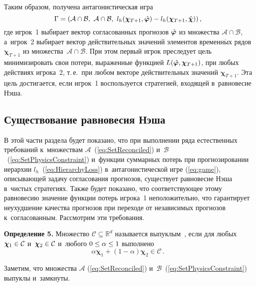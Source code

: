\begin{multicols}{2}
Таким образом, получена антагонистическая игра
\begin{equation}
\label{eq:game}
    \Gamma = (\mathcal{A} \cap \mathcal{B},~\mathcal{A} \cap \mathcal{B},~l_h(\boldsymbol{\chi}_{T+1}, \hat{\boldsymbol{\varphi}}) - l_h(\boldsymbol{\chi}_{T+1}, \hat{\boldsymbol{\chi}}))\,,
\end{equation}
где игрок~1 выбирает вектор согласованных прогнозов $\hat{\boldsymbol{\varphi}}$ из
множества $\mathcal{A} \cap \mathcal{B}$, а~игрок~2 выбирает вектор действительных
значений элементов временн$\acute{\mbox{ы}}$х рядов $\boldsymbol{\chi}_{T+1}$ из
множества~$\mathcal{A} \cap \mathcal{B}$. При этом первый игрок преследует цель
минимизировать свои потери, выраженные функцией $L(\hat{\boldsymbol{\varphi}},
\boldsymbol{\chi}_{T+1})$, при любых действиях игрока~2, т.\,е.\
при любом векторе действительных значений
$\boldsymbol{\chi}_{T+1}$. Эта цель достигается, если игрок~1
воспользуется стратегией, входящей в~равновесие Нэша.

\subsection{Существование равновесия Нэша}

В этой части раздела будет показано, что при выполнении ряда
естественных требований к~множествам $\mathcal{A}$~(\ref{eq:SetReconciled})
и~$\mathcal{B}$~(\ref{eq:SetPhysicsConstraint}) и~функции суммарных потерь
при прогнозировании иерархии $l_h$~(\ref{eq:HierarchyLoss})
в~антагонистической игре (\ref{eq:game}), описывающей задачу
согласования прогнозов, существует равновесие Нэша в~чис\-тых
стратегиях. Также будет показано, что соответствующее этому
равновесию значение функции потерь игрока~1 неположительно, что
гарантирует неухудшение качества прогнозов при переходе от
независимых прогнозов к~согласованным. Рас\-смот\-рим эти требования.

\smallskip

\noindent
\textbf{Определение 5.}
Множество $\mathcal{C} \subseteq \mathbb{R}^d$ называется
выпуклым~\cite{boyd2009convex}, если для любых $\boldsymbol{\chi}_1 \hm\in
\mathcal{C}$ и~$\boldsymbol{\chi}_2 \hm\in \mathcal{C}$ и~любого $0
\hm\leq \alpha \hm\leq 1$ выполнено
$$
    \alpha \boldsymbol{\chi}_1 + (1 - \alpha) \boldsymbol{\chi}_2 \in \mathcal{C}\,.
$$


\smallskip

Заметим, что множества $\mathcal{A}$ (\ref{eq:SetReconciled}) и~$\mathcal{B}$~(\ref{eq:SetPhysicsConstraint}) выпуклы и~замкнуты.

\smallskip


\end{multicols}
